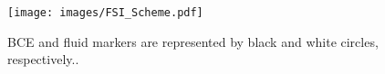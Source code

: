 \begin{figure}
	\begin{center}
		\texttt{[image: images/FSI\_Scheme.pdf]}
	\end{center}
	\caption{BCE and fluid markers are represented by black and white circles, respectively..}
	\label{fig:SPH_Kernel}
\end{figure}